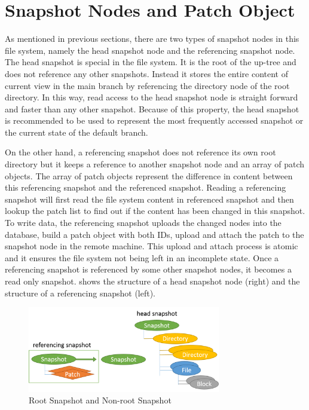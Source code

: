 \section{Snapshot Nodes and Patch Object}

    As mentioned in previous sections, there are two types of snapshot nodes in this file system, namely the head snapshot node and the referencing snapshot node. The head snapshot is special in the file system. It is the root of the up-tree and does not reference any other snapshots. Instead it stores the entire content of current view in the main branch by referencing the directory node of the root directory. In this way, read access to the head snapshot node is straight forward and faster than any other snapshot. Because of this property, the head snapshot is recommended to be used to represent the most frequently accessed snapshot or the current state of the default branch.

    On the other hand, a referencing snapshot does not reference its own root directory but it keeps a reference to another snapshot node and an array of patch objects. The array of patch objects represent the difference in content between this referencing snapshot and the referenced snapshot. Reading a referencing snapshot will first read the file system content in referenced snapshot and then lookup the patch list to find out if the content has been changed in this snapshot. To write data, the referencing snapshot uploads the changed nodes into the database, build a patch object with both IDs, upload and attach the patch to the snapshot node in the remote machine. This upload and attach process is atomic and it ensures the file system not being left in an incomplete state. Once a referencing snapshot is referenced by some other snapshot nodes, it becomes a read only snapshot.  shows the structure of a head snapshot node (right) and the structure of a referencing snapshot (left).
    
\begin{figure}[t]
\centering
\includegraphics[width=0.75\textwidth]{Chapter-4/figs/fig12.png}
\caption{Root Snapshot and Non-root Snapshot}
\label{fig:root_and_nonroot}
\end{figure}

